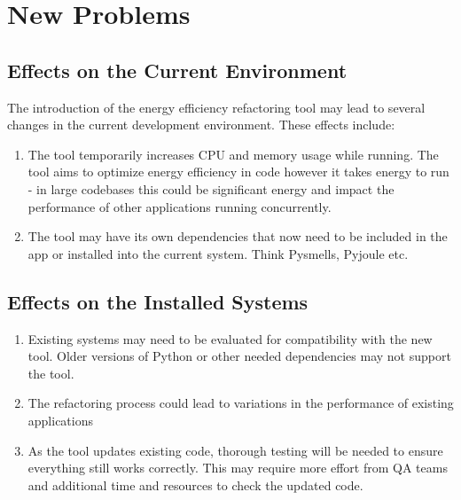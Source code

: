 \documentclass[12pt]{article}
\begin{document}
\section{New Problems}
\subsection{Effects on the Current Environment}
The introduction of the energy efficiency refactoring tool may lead
to several changes in the current development environment. These
effects include:
\begin{enumerate}
  \item The tool temporarily increases CPU and memory usage while
    running. The tool aims to optimize energy efficiency in code
    however it takes energy to run - in large codebases this could be
    significant energy and impact the performance of other
    applications running concurrently.
  \item The tool may have its own dependencies that now need to be
    included in the app or installed into the current system. Think
    Pysmells, Pyjoule etc.
\end{enumerate}

\subsection{Effects on the Installed Systems}
\begin{enumerate}
  \item Existing systems may need to be evaluated for compatibility
    with the new tool. Older versions of Python or other needed
    dependencies may not support the tool.
  \item The refactoring process could lead to variations in the
    performance of existing applications
  \item As the tool updates existing code, thorough testing will be
    needed to ensure everything still works correctly. This may
    require more effort from QA teams and additional time and
    resources to check the updated code.
\end{enumerate}
\end{document}
